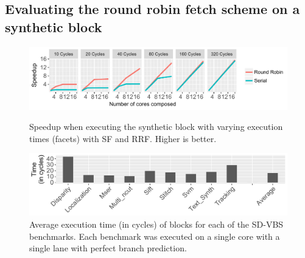 
\subsection{Evaluating the round robin fetch scheme on a synthetic block}

\begin{figure}[t]
    \centering
    \includegraphics[width=1\textwidth]{chapter3/graphics/motivation_fetch2.pdf}
   	\vspace{-0.5em}
 \caption{Speedup when executing the synthetic block with varying execution times (facets) with SF and RRF. Higher is better.}
    \label{fig:motiv_res}
    \centering
    \includegraphics[width=1\textwidth]{chapter3/graphics/sdvbsav.pdf}
    
	\vspace{-0.5em}
	\caption{Average execution time (in cycles) of blocks for each of the SD-VBS benchmarks. Each benchmark was executed on a single core with a single lane with perfect branch prediction.}
	
    \label{fig:svdbs_av}
\vspace{1em}
\end{figure}

